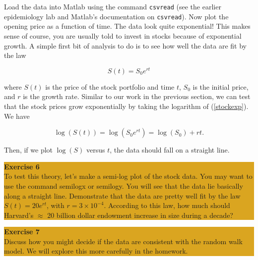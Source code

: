 \documentclass[12pt]{amsart}
\begin{document}
 \noindent Load the data into Matlab using the command \verb+csvread+ (see the earlier epidemiology lab and Matlab's documentation on \verb+csvread+).  Now plot the opening price as a function of time.  The data look quite exponential!  This makes sense of course, you are usually told to invest in stocks  because of exponential growth.  A simple first bit of analysis to do is to see how well the data are fit by the law
  
  \begin{equation}\label{stockexp}
  S(t) = S_0 e^{r t}
  \end{equation}
  
 \noindent where $S(t)$ is the price of the stock portfolio and time $t$, $S_0$ is the initial price, and $r$ is the growth rate.  Similar to our work in the previous section, we can test that the stock prices grow exponentially by taking the logarithm of (\ref{stockexp}).  We have
  
  \[
  \log(S(t)) = \log(S_0 e^{rt}) = \log(S_0) + r t.
  \]
  
  \noindent Then, if we plot $\log(S)$ versus $t$, the data should fall on a straight line.
  
   \bigskip
   \begin{center}
 \colorbox{Goldenrod}{\parbox{15cm}{
{
\textbf{\large Exercise 6}\vspace{1mm} \\
To test this theory, let's make a semi-log plot of the stock data.  You may want to use the command semilogx or semilogy.  You will see that the data lie  basically along a straight line.  Demonstrate that the data are pretty well fit by the law $S(t) = 20 e^{r t}$, with $r = 3 \times 10^{-4}$.  According to this law, how much should Harvard's $\approx$ 20 billion dollar endowment increase in size during a decade?
 }}}
  \end{center}
  
 \bigskip
     \begin{center}

   \colorbox{Goldenrod}{\parbox{15cm}{
{
\textbf{\large Exercise 7}\vspace{1mm} \\
Discuss how you might decide if the data are consistent with the random walk model.  We will explore this more carefully in the homework.}}}
  \end{center}
\end{document}
